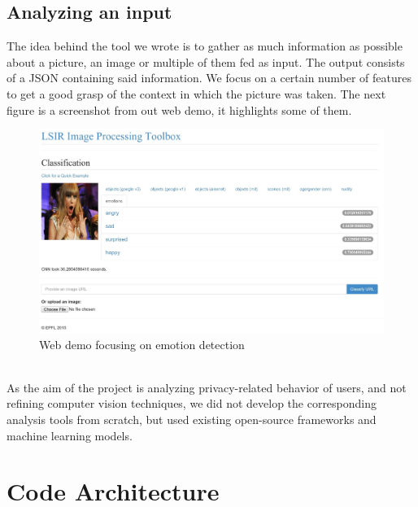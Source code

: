 \documentclass{article}
\begin{document}
    \subsection{Analyzing an input}
        The idea behind the tool we wrote is to gather as much information as possible about a picture, an image or multiple of them fed as input. The output consists of a JSON containing said information. We focus on a certain number of features to get a good grasp of the context in which the picture was taken. The next figure is a screenshot from out web demo, it highlights some of them. 
        \begin{figure}[h]
            \centering
            \includegraphics[scale=0.18]{emotions.jpg}
            \caption{Web demo focusing on emotion detection}
          \label{fig:emotions}
        \end{figure}
        \\As the aim of the project is analyzing privacy-related behavior of users, and not refining computer vision techniques, we did not develop the corresponding analysis tools from scratch, but used existing open-source frameworks and machine learning models.

\newpage
\section{Code Architecture}
\end{document}
